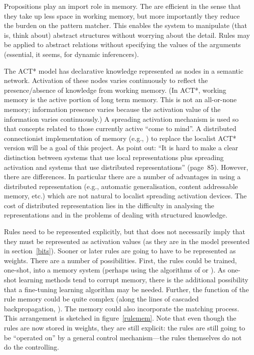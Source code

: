 Propositions play an import role in memory. The are efficient in the 
sense that they take up less space in working memory, but more
importantly they reduce the burden on the pattern matcher.  This
enables the system to
manipulate (that is, think about) abstract structures without
worrying about the detail.  Rules may be applied to abstract
relations without specifying the values of the arguments (essential,
it seems, for dynamic inferencers).

 The ACT* model has declarative
knowledge represented as nodes in a semantic network. Activation of
these nodes varies continuously to reflect the presence/absence of
knowledge from working memory. (In ACT*, working memory is the active
portion of long term memory. This is not an all-or-none memory;
information presence varies because the activation value of the
information varies continuously.)  A spreading activation mechanism is
used so that concepts related to those currently  active ``come to
mind''.  A distributed connectionist implementation of memory (e.g.,
) to replace the localist ACT* version will be a goal of
this project.  As
 point out: ``It is hard to make a clear distinction
between systems that use local representations plus spreading 
activation and systems that use distributed representations'' 
(page~85).  However, there are differences.  In particular there 
are a number of advantages in using a distributed representation 
(e.g., automatic generalisation, content addressable memory, etc.) 
which are not natural to localist spreading activation devices. 
The cost of distributed representation lies in the difficulty in 
analysing the representations and in the problems of dealing with
structured knowledge.

  Rules need to be represented explicitly, but that
does not necessarily imply that they must be represented as activation
values (as they are in the model presented in section~\ref{bits}).
Sooner or later rules are going to have to be represented as weights.
There are a number of possibilities.  First, the rules could be
trained, one-shot, into a memory system (perhaps using the algorithms
of  or ).  As one-shot learning methods
tend to corrupt memory, there is the additional possibility that a
fine-tuning learning algorithm may be needed.  Further, the function
of the rule memory could be quite complex (along the lines of cascaded
backpropagation, ). The memory could also incorporate
the matching process. This arrangement is sketched in
figure~\ref{rulemem}.  Note that even though the rules are now stored
in weights, they are still explicit: the rules are still going to be
``operated on'' by a general control mechanism---the rules themselves
do not do the controlling.

